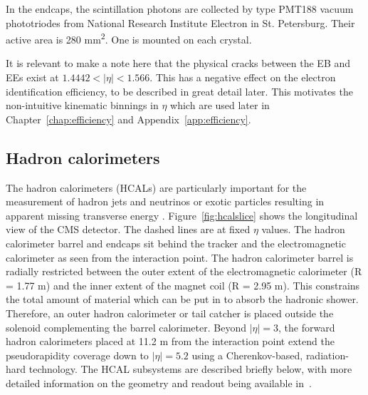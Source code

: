 In the endcaps, the scintillation photons are collected by type PMT188 vacuum phototriodes
from National Research Institute Electron in St. Petersburg.
Their active area is 280 mm\textsuperscript{2}. One is mounted on each crystal.

It is relevant to make a note here that the physical cracks between the EB and EEs exist at $1.4442 < |\eta| < 1.566$. 
This has a negative effect on the electron identification efficiency, to be described in great detail later.
This motivates the non-intuitive kinematic binnings in $\eta$ which are used later
in Chapter~\ref{chap:efficiency} and Appendix~\ref{app:efficiency}.

\subsection{Hadron calorimeters}
The hadron calorimeters (HCALs) are particularly important for the measurement of hadron jets and neutrinos or exotic particles resulting in apparent missing transverse energy \cite{CMSTDR}.
Figure~\ref{fig:hcalslice} shows the longitudinal view of the CMS detector. The dashed lines are at fixed $\eta$ values. 
The hadron calorimeter barrel and endcaps sit behind the tracker and the electromagnetic
calorimeter as seen from the interaction point. The hadron calorimeter barrel is radially restricted
between the outer extent of the electromagnetic calorimeter (R = 1.77 m) and the inner extent of
the magnet coil (R = 2.95 m). This constrains the total amount of material which can be put in
to absorb the hadronic shower. Therefore, an outer hadron calorimeter or tail catcher is placed
outside the solenoid complementing the barrel calorimeter. Beyond $|\eta| = 3$, the forward hadron
calorimeters placed at 11.2 m from the interaction point extend the pseudorapidity coverage down
to $|\eta| = 5.2$ using a Cherenkov-based, radiation-hard technology.
The HCAL subsystems are described briefly below, with more detailed information on the geometry and 
readout being available in~\cite{CMSTDR}.

